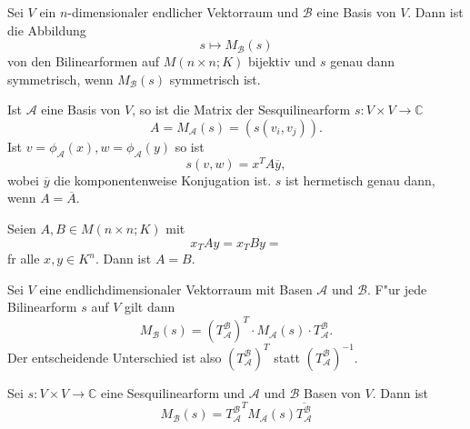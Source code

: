 \documentclass[11pt, a4paper]{article}
\begin{document}
\begin{theorem}
Sei $V$ ein $n$-dimensionaler endlicher Vektorraum und $\mathcal{B}$ eine Basis von $V$. Dann ist  die Abbildung
\begin{equation*}
s \mapsto M_{\mathcal{B}}(s)
\end{equation*}
von den Bilinearformen auf $M(n \times n; K)$ bijektiv und $s$ genau dann symmetrisch, wenn $M_{\mathcal{B}}(s)$ symmetrisch ist. 
\end{theorem}

\begin{remark}
Ist $\mathcal{A}$ eine Basis von $V$, so ist die Matrix der Sesquilinearform $s : V \times V \rightarrow \mathbb{C}$
\begin{equation*}
A = M_\mathcal{A}(s) = (s(v_i, v_j)).
\end{equation*}
Ist $v = \phi_\mathcal{A}(x), w = \phi_\mathcal{A} (y)$ so ist 
\begin{equation*}
s(v, w) = x^T A \overline{y},
\end{equation*}
wobei $\overline{y}$ die komponentenweise Konjugation ist.
$s$ ist hermetisch genau dann, wenn 
$A= \overline{A}$.
\end{remark}

\begin{lemma}
Seien $A, B \in M(n \times n; K)$ mit 
\begin{equation*}
x_TAy = x_TBy = 
\end{equation*}
f\uee r alle $x, y \in K^n$. Dann ist $A = B$. 
\end{lemma}

\begin{theorem}
Sei $V$ eine endlichdimensionaler Vektorraum mit Basen $\mathcal{A}$ und $ \mathcal{B}$. F"ur jede Bilinearform $s$ auf $V$ gilt dann
\begin{equation*}
M_\mathcal{B}(s) =( T^\mathcal{B}_\mathcal{A})^T \cdot M_\mathcal{A}(s) \cdot T^\mathcal{B}_\mathcal{A}.
\end{equation*}
Der entscheidende Unterschied ist also $( T^\mathcal{B}_\mathcal{A})^T$ statt $( T^\mathcal{B}_\mathcal{A})^{-1}$.
\end{theorem}

\begin{theorem} 
Sei $s : V \times V \rightarrow \mathbb{C}$ eine Sesquilinearform und $\mathcal{A}$ und  $\mathcal{B}$ Basen von $V$. Dann ist
\begin{equation*}
M_\mathcal{B}(s) = {T^\mathcal{B}_\mathcal{A}}^T M_\mathcal{A}(s) \overline{T^\mathcal{B}_\mathcal{A}}
\end{equation*}
\end{theorem}
\end{document}
